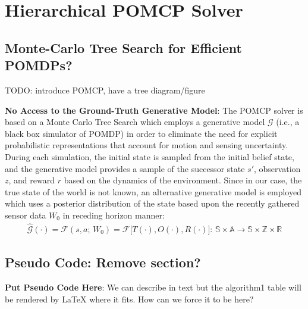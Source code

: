 \documentclass{article}
\newcommand{\ph}[1]{{\textbf{#1}:}} %
\begin{document}
\section{Hierarchical POMCP Solver}

\subsection{Monte-Carlo Tree Search for Efficient POMDPs?}

TODO:  introduce POMCP, have a tree diagram/figure

\ph{No Access to the Ground-Truth Generative Model}
The POMCP solver \cite{silver2010monte} is based on a Monte Carlo Tree Search which employs a generative model $\mathcal{G}$  (i.e., a black box simulator of POMDP) in order to eliminate the need for explicit probabilistic representations that account for motion and sensing uncertainty. During each simulation, the initial state is sampled from the initial belief state, and the generative model provides a sample of the successor state $s'$, observation $z$, and reward $r$ based on the dynamics of the environment. Since in our case, the true state of the world is not known, an alternative generative model is employed which uses a posterior distribution of the state based upon the recently gathered sensor data $W_0$ in receding horizon manner:
\begin{align}
    \hat{\mathcal{G}}(\cdot) = \mathcal{F}(s, a; \, W_0) = \mathcal{F}\big[T(\cdot), O(\cdot), R(\cdot)\big]: \, \mathbb{S} \times \mathbb{A} \rightarrow \mathbb{S} \times \mathbb{Z} \times \mathbb{R} 
\end{align}








\subsection{Pseudo Code: Remove section?}
\ph{Put Pseudo Code Here}
We can describe in text but the algorithm1 table will be rendered by LaTeX where it fits. How can we force it to be here?
\end{document}
